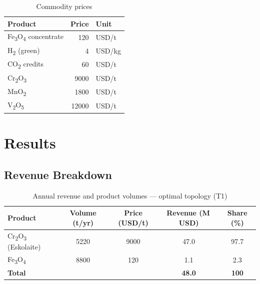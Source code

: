 \documentclass[11pt,a4paper]{article}
\begin{document}
\begin{table}[H]
\centering
\caption{Commodity prices}
\label{tab:prices}
\begin{tabular}{@{}lrl@{}}
\toprule
\textbf{Product} & \textbf{Price} & \textbf{Unit} \\
\midrule
Fe\textsubscript{3}O\textsubscript{4} concentrate & 120    & USD/t \\
H\textsubscript{2} (green)                         & 4      & USD/kg \\
CO\textsubscript{2} credits                        & 60     & USD/t \\
Cr\textsubscript{2}O\textsubscript{3}              & \num{9000}  & USD/t \\
MnO\textsubscript{2}                                & \num{1800}  & USD/t \\
V\textsubscript{2}O\textsubscript{5}               & \num{12000} & USD/t \\
\bottomrule
\end{tabular}
\end{table}

\section{Results}

\subsection{Revenue Breakdown}

\begin{table}[H]
\centering
\caption{Annual revenue and product volumes --- optimal topology (T1)}
\label{tab:rev}
\begin{tabular}{@{}lcccc@{}}
\toprule
\textbf{Product} & \textbf{Volume (t/yr)} & \textbf{Price (USD/t)} &
\textbf{Revenue (M\,USD)} & \textbf{Share (\%)} \\
\midrule
Cr\textsubscript{2}O\textsubscript{3} (Eskolaite) & \num{5220} & \num{9000} & 47.0 & 97.7 \\
Fe\textsubscript{3}O\textsubscript{4}              & \num{8800}  & 120       & 1.1  & 2.3  \\
\midrule
\textbf{Total}                                     &             &           & \textbf{48.0} & \textbf{100} \\
\bottomrule
\end{tabular}
\end{table}
\end{document}
